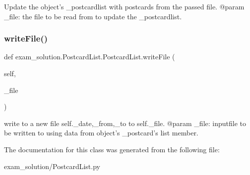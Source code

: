 \begin{DoxyVerb}Update the object's _postcardlist with
postcards from  the passed file.
@param _file: the file to be read from to
update the _postcardlist.
\end{DoxyVerb}
 \mbox{\label{classexam__solution_1_1PostcardList_1_1PostcardList_a560b7fa94c39e838c51d1630cf96357c}} 
\subsubsection{\texorpdfstring{writeFile()}{writeFile()}}
{\footnotesize\ttfamily def exam\+\_\+solution.\+Postcard\+List.\+Postcard\+List.\+write\+File (\begin{DoxyParamCaption}\item[{}]{self,  }\item[{}]{\+\_\+file }\end{DoxyParamCaption})}

\begin{DoxyVerb}write to a new file self.{_date,_from,_to} to self._file.
@param _file: inputfile to be written to using data  from
object's _postcard's list member.
\end{DoxyVerb}
 

The documentation for this class was generated from the following file\+:\begin{DoxyCompactItemize}
\item 
exam\+\_\+solution/Postcard\+List.\+py\end{DoxyCompactItemize}
